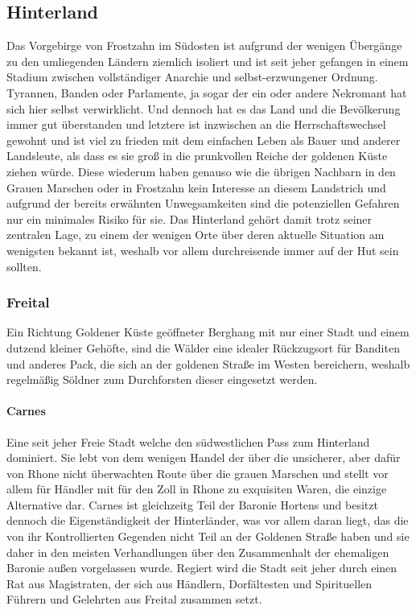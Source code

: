 \documentclass[a4paper,12pt,oneside]{book}
\begin{document}
\subsection{Hinterland}
Das Vorgebirge von Frostzahn im Südosten ist aufgrund der wenigen Übergänge zu den umliegenden Ländern ziemlich isoliert und ist seit jeher gefangen in einem Stadium zwischen vollständiger Anarchie und selbst-erzwungener Ordnung. Tyrannen, Banden oder Parlamente, ja sogar der ein oder andere Nekromant hat sich hier selbst verwirklicht. Und dennoch hat es das Land und die Bevölkerung immer gut überstanden und letztere ist inzwischen an die Herrschaftswechsel gewohnt und ist viel zu frieden mit dem einfachen Leben als Bauer und anderer Landsleute, als dass es sie groß in die prunkvollen Reiche der goldenen Küste ziehen würde. Diese wiederum haben genauso wie die übrigen Nachbarn in den Grauen Marschen oder in Frostzahn kein Interesse an diesem Landstrich und aufgrund der bereits erwähnten Unwegsamkeiten sind die potenziellen Gefahren nur ein minimales Risiko für sie. Das Hinterland gehört damit trotz seiner zentralen Lage, zu einem der wenigen Orte über deren aktuelle Situation am wenigsten bekannt ist, weshalb vor allem durchreisende immer auf der Hut sein sollten.
\subsubsection{Freital}
Ein Richtung Goldener Küste geöffneter Berghang mit nur einer Stadt und einem dutzend kleiner Gehöfte, sind die Wälder eine idealer Rückzugsort für Banditen und anderes Pack, die sich an der goldenen Straße im Westen bereichern, weshalb regelmäßig Söldner zum Durchforsten dieser eingesetzt werden. 
\paragraph{Carnes}
Eine seit jeher Freie Stadt welche den südwestlichen Pass zum Hinterland dominiert. Sie lebt von dem wenigen Handel der über die unsicherer, aber dafür von Rhone nicht überwachten Route über die grauen Marschen und stellt vor allem für Händler mit für den Zoll in Rhone zu exquisiten Waren, die einzige Alternative dar. Carnes ist gleichzeitg Teil der Baronie Hortens und besitzt dennoch die Eigenständigkeit der Hinterländer, was vor allem daran liegt, das die von ihr Kontrollierten Gegenden nicht Teil an der Goldenen Straße haben und sie daher in den meisten Verhandlungen über den Zusammenhalt der ehemaligen Baronie außen vorgelassen wurde. Regiert wird die Stadt seit jeher durch einen Rat aus Magistraten, der sich aus Händlern, Dorfältesten und Spirituellen Führern und Gelehrten aus Freital zusammen setzt.
\end{document}
